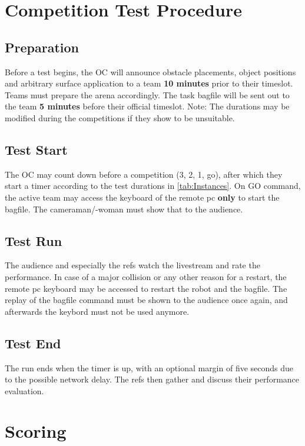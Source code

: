 \section{Competition Test Procedure} 
\label{sec:VRCTestExec}

\subsection{Preparation} 

Before a test begins, the OC will announce obstacle placements, object positions and arbitrary surface application to a team \textbf{10 minutes} prior to their timeslot. Teams must prepare the arena accordingly. The task bagfile will be sent out to the team \textbf{5 minutes} before their official timeslot. Note: The durations may be modified during the competitions if they show to be unsuitable.

\subsection{Test Start} 

The OC may count down before a competition (3, 2, 1, go), after which they start a timer according to the test durations in \ref{tab:Instances}. On GO command, the active team may access the keyboard of the remote pc \textbf{only} to start the bagfile. The cameraman/-woman must show that to the audience.

\subsection{Test Run} 

The audience and especially the refs watch the livestream and rate the performance. In case of a major collision or any other reason for a restart, the remote pc keyboard may be accessed to restart the robot and the bagfile. The replay of the bagfile command must be shown to the audience once again, and afterwards the keybord must not be used anymore.

\subsection{Test End} 

The run ends when the timer is up, with an optional margin of five seconds due to the possible network delay. The refs then gather and discuss their performance evaluation.  

\section{Scoring} 
\label{sec:VRCScoring}

